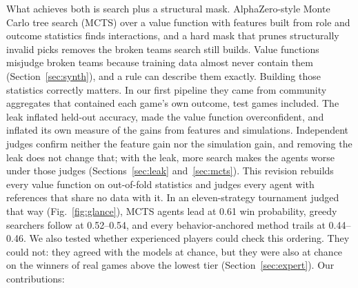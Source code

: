 \documentclass[journal]{IEEEtran}
\begin{document}
What achieves both is search plus a structural mask. AlphaZero-style Monte Carlo tree search (MCTS) over a value function with features built from role and outcome statistics finds interactions, and a hard mask that prunes structurally invalid picks removes the broken teams search still builds. Value functions misjudge broken teams because training data almost never contain them (Section~\ref{sec:synth}), and a rule can describe them exactly. Building those statistics correctly matters. In our first pipeline they came from community aggregates that contained each game's own outcome, test games included. The leak inflated held-out accuracy, made the value function overconfident, and inflated its own measure of the gains from features and simulations. Independent judges confirm neither the feature gain nor the simulation gain, and removing the leak does not change that; with the leak, more search makes the agents worse under those judges (Sections~\ref{sec:leak} and~\ref{sec:mcts}). This revision rebuilds every value function on out-of-fold statistics and judges every agent with references that share no data with it. In an eleven-strategy tournament judged that way (Fig.~\ref{fig:glance}), MCTS agents lead at 0.61 win probability, greedy searchers follow at 0.52--0.54, and every behavior-anchored method trails at 0.44--0.46. We also tested whether experienced players could check this ordering. They could not: they agreed with the models at chance, but they were also at chance on the winners of real games above the lowest tier (Section~\ref{sec:expert}). Our contributions:
\end{document}
